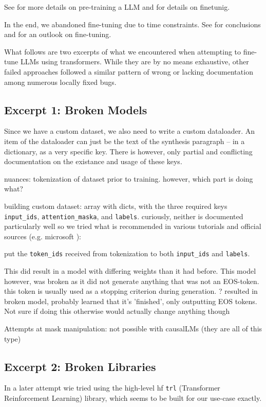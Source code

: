 See  for more details on pre-training a \gls{LLM} and  for details on finetunig.

In the end, we abandoned fine-tuning due to time constraints. See  for conclusions and  for an outlook on fine-tuning.

What follows are two excerpts of what we encountered when attempting to fine-tune \glspl{LLM} using \gls{transformers}.
While they are by no means exhaustive, other failed approaches followed a similar pattern of wrong or lacking documentation among numerous locally fixed bugs.

\subsection{Excerpt 1: Broken Models}\label{sub:brokenft}
Since we have a custom dataset, we also need to write a custom dataloader.
An item of the dataloader can just be the text of the synthesis paragraph -- in a dictionary, as a very specific key.
There is however, only partial and conflicting documentation on the existance and usage of these keys.

nuances: tokenization of dataset prior to training. however, which part is doing what?

building custom dataset: array with dicts, with the three required keys \verb`input_ids`, \verb`attention_maska`, and \verb`labels`. curiously, neither is documented particularly well so we tried what is recommended in various tutorials and official sources (e.g. microsoft \cite{deepspeedexamples_2023}): 

put the \verb`token_ids` received from tokenization to both \verb`input_ids` and \verb`labels`.

This did result in a model with differing weights than it had before. This model however, was broken as it did not generate anything that was not an EOS-token.
this token is usually used as a stopping criterion during generation.
? resulted in broken model, probably learned that it's 'finished', only outputting EOS tokens. Not sure if doing this otherwise would actually change anything though

Attempts at mask manipulation: not possible with causalLMs (they are all of this type)

\subsection{Excerpt 2: Broken Libraries}\label{sub:libraries}
In a later attempt wie tried using the high-level \gls{hf} \verb`trl` (Transformer Reinforcement Learning) library, which seems to be built for our use-case exactly.

